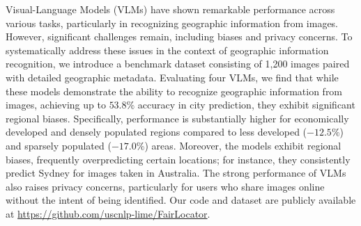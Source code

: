 Visual-Language Models (VLMs) have shown remarkable performance across various tasks, particularly in recognizing geographic information from images.
However, significant challenges remain, including biases and privacy concerns.
To systematically address these issues in the context of geographic information recognition, we introduce a benchmark dataset consisting of 1,200 images paired with detailed geographic metadata.
Evaluating four VLMs, we find that while these models demonstrate the ability to recognize geographic information from images, achieving up to $53.8\%$ accuracy in city prediction, they exhibit significant regional biases.
Specifically, performance is substantially higher for economically developed and densely populated regions compared to less developed ($-12.5\%$) and sparsely populated ($-17.0\%$) areas.
Moreover, the models exhibit regional biases, frequently overpredicting certain locations; for instance, they consistently predict Sydney for images taken in Australia.
The strong performance of VLMs also raises privacy concerns, particularly for users who share images online without the intent of being identified.
Our code and dataset are publicly available at \url{https://github.com/uscnlp-lime/FairLocator}.